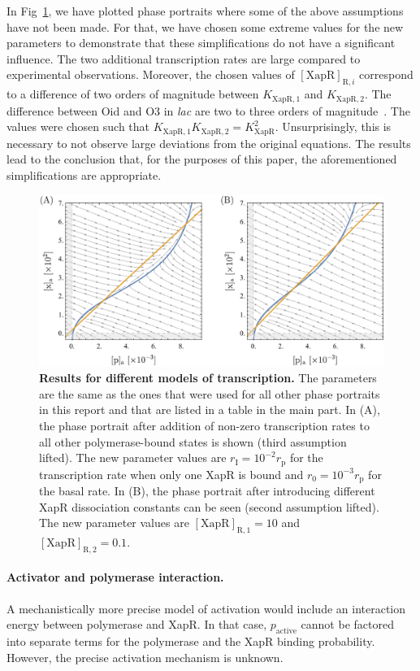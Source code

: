 \documentclass[10pt,letterpaper]{article}
\newcommand{\n}[1]{\mathrm{#1}}
\begin{document}
In Fig~\ref{figS1:transcription}, we have plotted phase portraits where some of the above assumptions have not been made. For that, we have chosen some extreme values for the new parameters to demonstrate that these simplifications do not have a significant influence. The two additional transcription rates are large compared to experimental observations. Moreover, the chosen values of $\n{[XapR]}_{\n{R},i}$ correspond to a difference of two orders of magnitude between $K_{\n{XapR,1}}$ and $K_{\n{XapR,2}}$. The difference between Oid and O3 in \emph{lac} are two to three orders of magnitude~\cite{RazoMejia2018}. The values were chosen such that $K_{\n{XapR,1}} K_{\n{XapR,2}} = K_{\n{XapR}}^2$. Unsurprisingly, this is necessary to not observe large deviations from the original equations. The results lead to the conclusion that, for the purposes of this paper, the aforementioned simplifications are appropriate.

\begin{figure}
	\centering
	\includegraphics[width=\textwidth]{FigSI1.pdf}
	\caption{{\bf Results for different models of transcription.}
		The parameters are the same as the ones that were used for all other phase portraits in this report and that are listed in a table in the main part. In (A), the phase portrait after addition of non-zero transcription rates to all other polymerase-bound states is shown (third assumption lifted). The new parameter values are $r_{\n{I}} = 10^{-2} r_{\n{p}}$ for the transcription rate when only one XapR is bound and $r_{\n{0}} = 10^{-3} r_{\n{p}}$ for the basal rate. In (B), the phase portrait after introducing different XapR dissociation constants can be seen (second assumption lifted). The new parameter values are $\n{[XapR]_{R,1}} = 10$ and $\n{[XapR]_{R,2}} = 0.1$.}
	\label{figS1:transcription}
\end{figure}

\paragraph*{Activator and polymerase interaction.} A mechanistically more precise model of activation would include an interaction energy between polymerase and XapR. In that case, $p_{\n{active}}$ cannot be factored into separate terms for the polymerase and the XapR binding probability. However, the precise activation mechanism is unknown.
\end{document}
